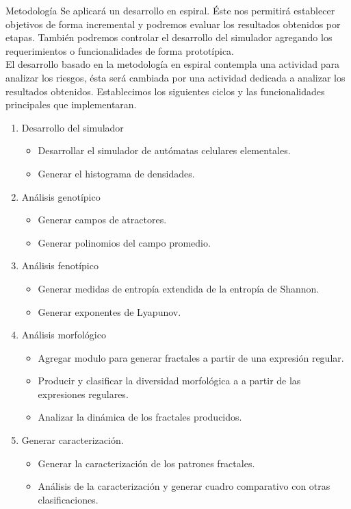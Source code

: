 \documentclass{article}
\begin{document}
    \begin{section}{Metodología}
        \noindent Se aplicará un desarrollo en espiral. Éste nos permitirá establecer objetivos de forma incremental y podremos evaluar los resultados obtenidos por etapas. También podremos controlar el desarrollo del simulador agregando los requerimientos o funcionalidades de forma prototípica.\\
        \noindent El desarrollo basado en la metodología en espiral contempla una actividad para analizar los riesgos, ésta será cambiada por una actividad dedicada a analizar los resultados obtenidos.
        \noindent Establecimos los siguientes ciclos y las funcionalidades principales que implementaran.   
        \begin{enumerate}
            \item Desarrollo del simulador 
            \begin{itemize}
            \item Desarrollar el simulador de autómatas celulares elementales. 
                \item Generar el histograma de densidades. 
            \end{itemize} 
            \item Análisis genotípico
                \begin{itemize}
                     \item Generar campos de atractores.
                    \item Generar polinomios del campo promedio.
                \end{itemize}
            \item Análisis fenotípico
                \begin{itemize}
                  \item Generar medidas de entropía extendida de la entropía  de Shannon.
                    \item Generar exponentes de Lyapunov.
                \end{itemize}
            \item Análisis morfológico
                \begin{itemize}
                    \item Agregar modulo para generar fractales a partir de una expresión regular. 
                    \item Producir y clasificar la diversidad morfológica a a partir de las expresiones regulares. 
                    \item Analizar la dinámica de los fractales producidos. 
                \end{itemize}
            \item Generar caracterización.
                \begin{itemize}
                    \item Generar la caracterización de los patrones fractales.
                    \item Análisis de la caracterización y generar cuadro comparativo con otras clasificaciones. 
                \end{itemize}
        \end{enumerate}
    \end{section}
    
\end{document}
